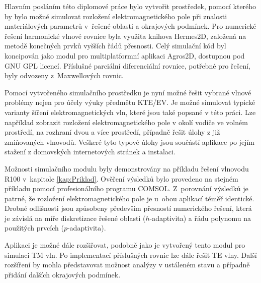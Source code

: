 
Hlavním posláním této diplomové práce bylo vytvořit prostředek, pomocí kterého by bylo možné simulovat rozložení elektromagnetického pole při znalosti materiálových parametrů v~řešené oblasti a okrajových podmínek. Pro numerické řešení harmonické vlnové rovnice byla využita knihova Hermes2D, založená na metodě konečných prvků vyšších řádů přesnosti.
Celý simulační kód byl koncipován jako modul pro multiplatformní aplikaci Agros2D, dostupnou pod GNU GPL licencí. Příslušné parciální diferenciální rovnice, potřebné pro řešení, byly odvozeny z~Maxwellových rovnic.

Pomocí vytvořeného simulačního prostředku je nyní možné řešit vybrané vlnové problémy nejen pro účely výuky předmětu KTE/EV. Je možné simulovat typické varianty šíření elektromagnetických vln, které jsou také popsané v této práci. Lze například zobrazit rozložení elektromagnetického pole v okolí vodiče ve volném prostředí, na rozhraní dvou a více prostředí, případně řešit úlohy z již zmiňovaných vlnovodů. Veškeré tyto typové úlohy jsou součástí aplikace po jejím stažení z domovských internetových stránek a instalaci. 

Možnosti simulačního modulu byly demonstrovány na příkladu řešení vlnovodu R100 v~kapitole \ref{kap:Priklad}. Ověření výsledků bylo provedeno na stejném příkladu pomocí profesionálního programu COMSOL. Z~porovnání výsledků je patrné, že rozložení elektromagnetického pole je u~obou aplikací téměř identické. Drobné odlišnosti jsou způsobeny především přesností numerického řešení, která je závislá na míře diskretizace řešené oblasti ($h$-adaptivita) a řádu polynomu na použitých prvcích ($p$-adaptivita).

Aplikaci je možné dále rozšiřovat, podobně jako je vytvořený tento modul pro simulaci TM vln. Po implementací příslušných rovnic lze dále řešit TE vlny. Další rozšíření by mohla představovat možnost analýzy v ustáleném stavu a případně přidání dalších okrajových podmínek. 






